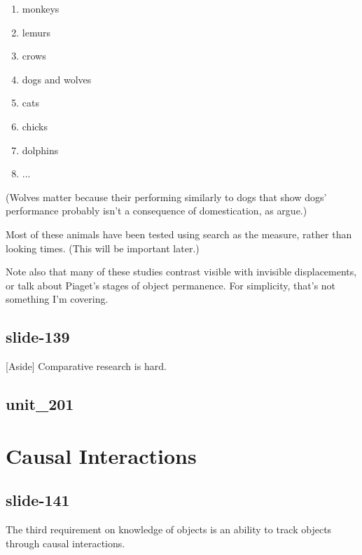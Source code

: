 \documentclass[12pt,\papersize]{extarticle}
\begin{document}
\begin{enumerate}
 
\item monkeys \citep{santos:2006_cotton-top}
 
\item lemurs \citep{deppe:2009_object}
 
\item crows \citep{hoffmann:2011_ontogeny}
 
\item dogs and wolves \citep{fiset:2013_object}
 
\item cats \citep{triana:1981_object}
 
\item chicks \citep{chiandetti:2011_chicks_op}
 
\item dolphins \citep{jaakkola:2010_what}
 
\item ...
 
\end{enumerate}
 
(Wolves matter because their performing similarly to dogs that show dogs' performance probably isn't a consequence of domestication, as \citet{fiset:2013_object} argue.)
 
Most of these animals have been tested using search as the measure, rather than looking times.
 (This will be important later.)
 
 
 
Note also that many of these studies contrast visible with invisible displacements, or talk about Piaget's stages of object permanence.  For simplicity, that's not something I'm covering.
 
\subsection{slide-139}
[Aside] Comparative research is hard.
 
\subsection{unit\_201}
 
 
\section{Causal Interactions}
 
\subsection{slide-141}
The third requirement on knowledge of objects is an ability to track objects through causal interactions.
 
\end{document}
